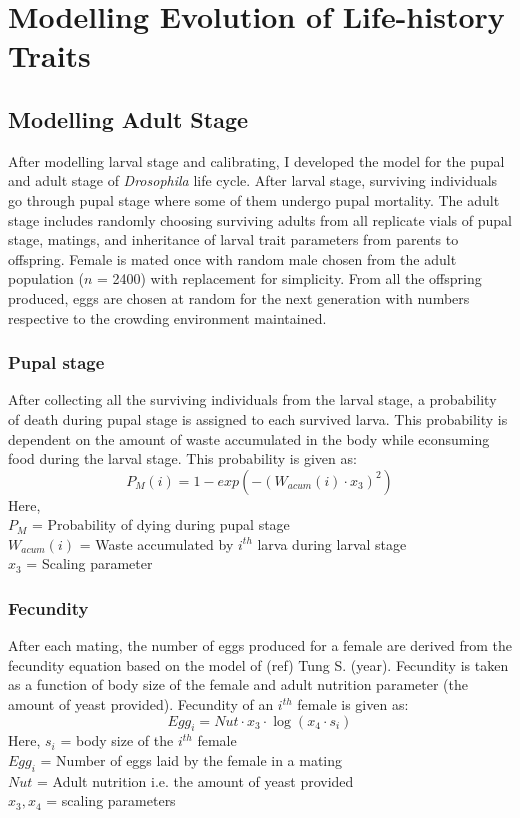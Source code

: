 \chapter{Modelling Evolution of Life-history Traits}

\section{Modelling Adult Stage}
After modelling larval stage and calibrating, I developed the model for the pupal and adult stage of \textit{Drosophila} life cycle. After larval stage, surviving individuals go through pupal stage where some of them undergo pupal mortality. The adult stage includes randomly choosing surviving adults from all replicate vials of pupal stage, matings, and inheritance of larval trait parameters from parents to offspring. Female is mated once with random male chosen from the adult population ($n$ = 2400) with replacement for simplicity. From all the offspring produced, eggs are chosen at random for the next generation with numbers respective to the crowding environment maintained.
\subsection{Pupal stage}
After collecting all the surviving individuals from the larval stage, a probability of death during pupal stage is assigned to each survived larva. This probability is dependent on the amount of waste accumulated in the body while econsuming food during the larval stage. This probability is given as:
\[P_{M}(i) = 1 - exp(-(W_{acum}(i) \cdot x_{3})^{2})\]
Here, \\
$P_{M}$ = Probability of dying during pupal stage \\
$W_{acum}(i)$ = Waste accumulated by $i^{th}$ larva during larval stage \\
$x_{3}$ = Scaling parameter
\subsection{Fecundity}
After each mating, the number of eggs produced for a female are derived from the fecundity equation based on the model of (ref) Tung S. (year). Fecundity is taken as a function of body size of the female and adult nutrition parameter (the amount of yeast provided). Fecundity of an $i^{th}$ female is given as:
\[Egg_{i} = Nut \cdot x_{3} \cdot \log{(x_{4} \cdot s_{i})}\]
Here, $s_{i}$ = body size of the $i^{th}$ female \\
$Egg_{i}$ = Number of eggs laid by the female in a mating \\
$Nut$ = Adult nutrition i.e. the amount of yeast provided \\
$x_{3}, x_{4}$ = scaling parameters
